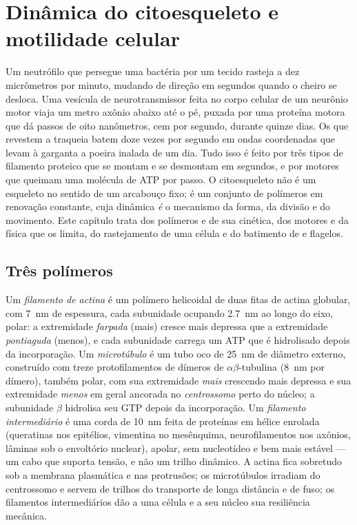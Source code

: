 \chapter{Dinâmica do citoesqueleto e motilidade celular}\label{ch:b3:cytoskeleton-motility}

Um neutrófilo que persegue uma bactéria por um tecido rasteja a dez
micrômetros por minuto, mudando de direção em segundos quando o cheiro
se desloca. Uma vesícula de neurotransmissor feita no corpo celular de
um neurônio motor viaja um metro axônio abaixo até o pé, puxada por uma
proteína motora que dá passos de oito nanômetros, cem por segundo,
durante quinze dias. Os  que revestem a traqueia batem doze vezes
por segundo em ondas coordenadas que levam à garganta a poeira inalada
de um dia. Tudo isso é feito por três tipos de filamento proteico que
se montam e se desmontam em segundos, e por motores que queimam uma
molécula de ATP por passo. O citoesqueleto não é um esqueleto no
sentido de um arcabouço fixo; é um conjunto de polímeros em renovação
constante, cuja dinâmica \emph{é} o mecanismo da forma, da divisão e do
movimento. Este capítulo trata dos polímeros e de sua cinética, dos
motores e da física que os limita, do rastejamento de uma célula e do
batimento de  e flagelos.

\section{Três polímeros}

\begin{definition}\label{def:b3:cytoskeleton-motility:filaments}
Um \emph{filamento de actina} é um polímero helicoidal de duas fitas de
actina globular, com \qty{7}{nm} de espessura, cada subunidade
ocupando \qty{2.7}{nm} ao longo do eixo, polar: a extremidade
\emph{farpada} (mais) cresce mais depressa que a extremidade
\emph{pontiaguda} (menos), e cada subunidade carrega um ATP que é
hidrolisado depois da incorporação. Um \emph{microtúbulo} é um tubo oco
de \qty{25}{nm} de diâmetro externo, construído com treze
protofilamentos de dímeros de $\alpha\beta$-tubulina (\qty{8}{nm} por
dímero), também polar, com sua extremidade \emph{mais} crescendo mais
depressa e sua extremidade \emph{menos} em geral ancorada no
\emph{centrossomo} perto do núcleo; a subunidade $\beta$ hidrolisa seu
GTP depois da incorporação. Um \emph{filamento intermediário} é uma
corda de \qty{10}{nm} feita de proteínas em hélice enrolada (queratinas
nos epitélios, vimentina no mesênquima, neurofilamentos nos axônios,
lâminas sob o envoltório nuclear), apolar, sem nucleotídeo e bem mais
estável --- um cabo que suporta tensão, e não um trilho dinâmico. A
actina fica sobretudo sob a membrana plasmática e nas protrusões; os
microtúbulos irradiam do centrossomo e servem de trilhos do transporte
de longa distância e de fuso; os filamentos intermediários dão a uma
célula e a seu núcleo sua resiliência mecânica.
\end{definition}

